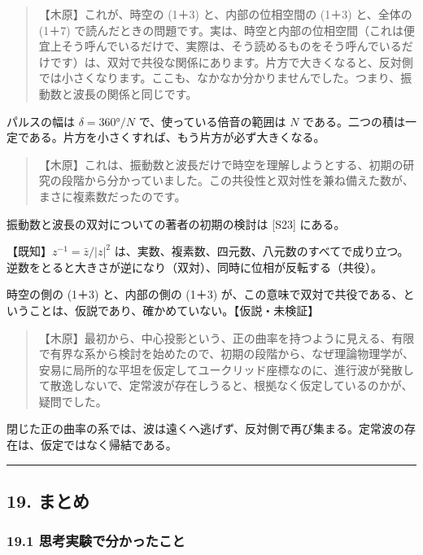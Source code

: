\documentclass[
  a4paper,
]{ltjsarticle}
\begin{document}
\begin{quote}
【木原】これが、時空の (1＋3) と、内部の位相空間の (1＋3) と、全体の
(1＋7)
で読んだときの問題です。実は、時空と内部の位相空間（これは便宜上そう呼んでいるだけで、実際は、そう読めるものをそう呼んでいるだけです）は、双対で共役な関係にあります。片方で大きくなると、反対側では小さくなります。ここも、なかなか分かりませんでした。つまり、振動数と波長の関係と同じです。
\end{quote}

パルスの幅は \(\delta = 360°/N\) で、使っている倍音の範囲は \(N\)
である。二つの積は一定である。片方を小さくすれば、もう片方が必ず大きくなる。

\begin{quote}
【木原】これは、振動数と波長だけで時空を理解しようとする、初期の研究の段階から分かっていました。この共役性と双対性を兼ね備えた数が、まさに複素数だったのです。
\end{quote}

振動数と波長の双対についての著者の初期の検討は {[}S23{]} にある。

【既知】\(z^{-1} = \bar z/\lvert z\rvert^2\)
は、実数、複素数、四元数、八元数のすべてで成り立つ。逆数をとると大きさが逆になり（双対）、同時に位相が反転する（共役）。

時空の側の (1＋3) と、内部の側の (1＋3)
が、この意味で双対で共役である、ということは、仮説であり、確かめていない。【仮説・未検証】

\begin{quote}
【木原】最初から、中心投影という、正の曲率を持つように見える、有限で有界な系から検討を始めたので、初期の段階から、なぜ理論物理学が、安易に局所的な平坦を仮定してユークリッド座標なのに、進行波が発散して散逸しないで、定常波が存在しうると、根拠なく仮定しているのかが、疑問でした。
\end{quote}

閉じた正の曲率の系では、波は遠くへ逃げず、反対側で再び集まる。定常波の存在は、仮定ではなく帰結である。

\begin{center}\rule{0.5\linewidth}{0.5pt}\end{center}

\subsection{19. まとめ}\label{ux307eux3068ux3081}

\subsubsection{19.1
思考実験で分かったこと}\label{ux601dux8003ux5b9fux9a13ux3067ux5206ux304bux3063ux305fux3053ux3068}
\end{document}

